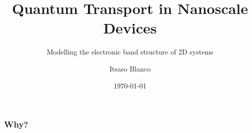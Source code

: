 \documentclass{beamer}
\title[Quantum Transport in Nanoscale Devices]{Quantum Transport in Nanoscale Devices}
\subtitle{Modelling the electronic band structure of 2D systems}
\author{Itsaso Blanco}
\date{\today}
\institute{Donostia International Physics Center}
\begin{document}
		\begin{frame}
			\frametitle{Why?}
		\end{frame}
\end{document}
